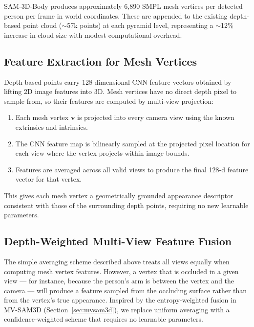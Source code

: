 \documentclass[12pt, a4paper, oneside]{report}
\begin{document}
SAM-3D-Body \cite{sam3dteam2025sam3d3dfyimages} produces approximately 6,890 SMPL \cite{loper2015smpl} mesh vertices per detected person per frame in world coordinates. These are appended to the existing depth-based point cloud ($\sim$57k points) at each pyramid level, representing a $\sim$12\% increase in cloud size with modest computational overhead.

\subsection{Feature Extraction for Mesh Vertices}
Depth-based points carry 128-dimensional CNN feature vectors obtained by lifting 2D image features into 3D. Mesh vertices have no direct depth pixel to sample from, so their features are computed by multi-view projection:
\begin{enumerate}
    \item Each mesh vertex $\mathbf{v}$ is projected into every camera view using the known extrinsics and intrinsics.
    \item The CNN feature map is bilinearly sampled at the projected pixel location for each view where the vertex projects within image bounds.
    \item Features are averaged across all valid views to produce the final 128-d feature vector for that vertex.
\end{enumerate}
This gives each mesh vertex a geometrically grounded appearance descriptor consistent with those of the surrounding depth points, requiring no new learnable parameters.

\subsection{Depth-Weighted Multi-View Feature Fusion}
\label{sec:depth_weighted_fusion}
The simple averaging scheme described above treats all views equally when computing mesh vertex features. However, a vertex that is occluded in a given view --- for instance, because the person's arm is between the vertex and the camera --- will produce a feature sampled from the occluding surface rather than from the vertex's true appearance. Inspired by the entropy-weighted fusion in MV-SAM3D \cite{li2026mvsam3dadaptivemultiviewfusion} (Section~\ref{sec:mvsam3d}), we replace uniform averaging with a confidence-weighted scheme that requires no learnable parameters.
\end{document}

